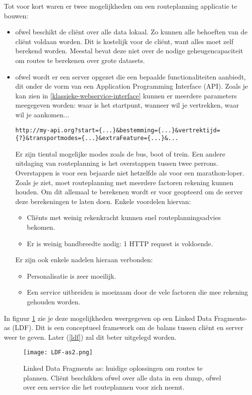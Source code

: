 Tot voor kort waren er twee mogelijkheden om een routeplanning applicatie te bouwen:
\begin{itemize}
\item ofwel beschikt de cli\"ent over alle data lokaal. Zo kunnen alle behoeften van de cli\"ent voldaan worden. Dit is kostelijk voor de cli\"ent, want alles moet zelf berekend worden. Meestal bevat deze niet over de nodige geheugencapaciteit om routes te berekenen over grote datasets.
\item ofwel wordt er een server opgezet die een bepaalde functionaliteiten aanbiedt, dit onder de vorm van een  Application Programming Interface (API). Zoals je kan zien in \ref{klassieke-webservice-interface} kunnen er meerdere parameters meegegeven worden: waar is het startpunt, wanneer wil je vertrekken, waar wil je aankomen...
\begin{lstlisting}[label=klassieke-webservice-interface,caption=Klassieke webservice interface]
http://my-api.org?start={...}&bestemming={...}&vertrektijd={?}&transportmodes={...}&extraFeature={...}&...
\end{lstlisting}
Er zijn tiental mogelijke modes zoals de bus, boot of trein. Een andere uitdaging van routeplanning is het overstappen tussen twee perrons. Overstappen is voor een bejaarde niet hetzelfde als voor een marathon-loper.
Zoals je ziet, moet routeplanning met meerdere factoren rekening kunnen houden. Om dit allemaal te berekenen wordt er voor geopteerd om de server deze berekeningen te laten doen.
Enkele voordelen hiervan:
\begin{itemize}
\item Cli\"ents met weinig rekenkracht kunnen snel routeplanningsadvies bekomen.
\item Er is weinig bandbreedte nodig: 1 HTTP request is voldoende.
\end{itemize}
Er zijn ook enkele nadelen hieraan verbonden:
\begin{itemize}
\item Personalisatie is zeer moeilijk.
\item Een service uitbreiden is moeizaam door de vele factoren die mee rekening gehouden worden.\end{itemize}
\end{itemize}

In figuur \ref{probleemrouteplanning} zie je deze mogelijkheden weergegeven op een Linked Data Fragments-as (LDF). Dit is een conceptueel framework om de balans tussen cli\"ent en server weer te geven. Later (\ref{ldf}) zal dit beter uitgelegd worden.
 \begin{figure}[h!]
\centering
\texttt{[image: LDF-as2.png]}
\caption{Linked Data Fragments as: huidige oplossingen om routes te plannen. Cli\"ent beschikken ofwel over alle data in een dump, ofwel over een service die het routeplannen voor zich neemt.}
\label{probleemrouteplanning}
\end{figure}

